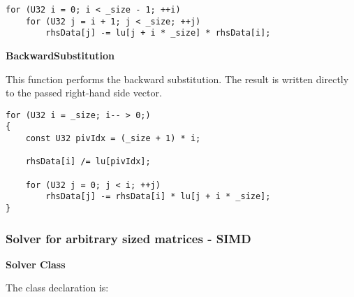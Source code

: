 \begin{verbatim}
for (U32 i = 0; i < _size - 1; ++i)
    for (U32 j = i + 1; j < _size; ++j)
        rhsData[j] -= lu[j + i * _size] * rhsData[i];
\end{verbatim}





\vspace{1cm}
\textbf{BackwardSubstitution}
\vspace{0.5cm}

This function performs the backward substitution.
The result is written directly to the passed right-hand side vector.

\begin{verbatim}
for (U32 i = _size; i-- > 0;)
{
    const U32 pivIdx = (_size + 1) * i;

    rhsData[i] /= lu[pivIdx];

    for (U32 j = 0; j < i; ++j)
        rhsData[j] -= rhsData[i] * lu[j + i * _size];
}
\end{verbatim}





\newpage
\subsubsection{Solver for arbitrary sized matrices - SIMD}

\vspace{0.5cm}
\textbf{Solver Class}
\vspace{0.5cm}

The class declaration is:

